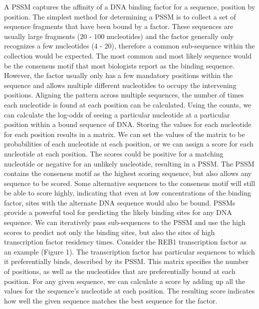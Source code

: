 \documentclass{article}
\newcommand{\tab}{\hspace{9mm}}
\begin{document}
\tab A PSSM captures the affinity of a DNA binding factor for a sequence, position by position. The simplest method for determining a PSSM is to collect a set of sequence fragments that have been bound by a factor. These sequences are usually large fragments ($20$ - $100$ nucleotides) and the factor generally only recognizes a few nucleotides ($4$ - $20$), therefore a common sub-sequence within the collection would be expected. The most common and most likely sequence would be the consensus motif that most biologists report as the binding sequence. However, the factor usually only has a few mandatory positions within the sequence and allows multiple different nucleotides to occupy the intervening positions. Aligning the pattern across multiple sequences, the number of times each nucleotide is found at each position can be calculated. Using the counts, we can calculate the log-odds of seeing a particular nucleotide at a particular position within a bound sequence of DNA. Storing the values for each nucleotide for each position results in a matrix. We can set the values of the matrix to be probabilities of each nucleotide at each position, or we can assign a score for each nucleotide at each position. The scores could be positive for a matching nucleotide or negative for an unlikely nucleotide, resulting in a PSSM. The PSSM contains the consensus motif as the highest scoring sequence, but also allows any sequence to be scored. Some alternative sequences to the consensus motif will still be able to score highly, indicating that even at low concentrations of the binding factor, sites with the alternate DNA sequence would also be bound. PSSMs provide a powerful tool for predicting the likely binding sites for any DNA sequence. We can iteratively pass sub-sequences to the PSSM and use the high scores to predict not only the binding sites, but also the sites of high transcription factor residency times. Consider the REB1 transcription factor as an example (Figure 1). The transcription factor has particular sequences to which it preferentially binds, described by its PSSM. This matrix specifies the number of positions, as well as the nucleotides that are preferentially bound at each position. For any given sequence, we can calculate a score by adding up all the values for the sequence's nucleotide at each position. The resulting score indicates how well the given sequence matches the best sequence for the factor.
\end{document}
